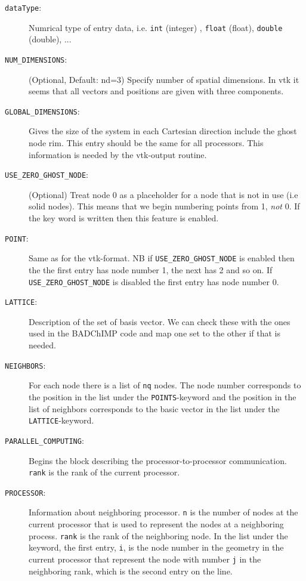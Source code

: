 \documentclass[11pt,a4paper]{report}
\begin{document}
\begin{description}
\item[\texttt{dataType}:] Numrical type of entry data, i.e. \texttt{int} (integer) , \texttt{float} (float), \texttt{double} (double), ... 
%	
\item[\texttt{NUM{\_}DIMENSIONS}:] (Optional, Default: nd=3)  Specify number of spatial dimensions. In vtk it seems that all vectors and positions are given with three components. 
%
\item[\texttt{GLOBAL{\_}DIMENSIONS}:] Gives the size of the system in each Cartesian direction include the ghost node rim. This entry should be the same for all processors. This information is needed by the vtk-output routine.
%
\item[\texttt{USE{\_}ZERO{\_}GHOST{\_}NODE}:] (Optional) Treat node 0 as a placeholder for a node that is not in use (i.e solid nodes). This means that we begin numbering points from 1, \emph{not} 0. If the key word is written then this feature is enabled.
%
\item[\texttt{POINT}:] Same as for the vtk-format. NB if \texttt{USE{\_}ZERO{\_}GHOST{\_}NODE} is enabled then the the first entry has node number 1, the next has 2 and so on. If \texttt{USE{\_}ZERO{\_}GHOST{\_}NODE} is disabled  the first entry has node number 0.
%
\item[\texttt{LATTICE}:] Description of the set of basis vector. We can check these with the ones used in the BADChIMP code and map one set to the other if that is needed.
%
\item[\texttt{NEIGHBORS}:]  For each node there is a list of \texttt{nq} nodes. The node number corresponds to the position in the list under the \texttt{POINTS}-keyword and the position in the list of neighbors corresponds to the basic vector in the list under the \texttt{LATTICE}-keyword.
%
\item[\texttt{PARALLEL{\_}COMPUTING}:] Begins the block describing the processor-to-processor communication. \texttt{rank} is the rank of the current processor.
%
\item[\texttt{PROCESSOR}:]  Information about neighboring processor. \texttt{n} is the number of nodes at the current processor that is used to represent the nodes at a neighboring process. \texttt{rank} is the rank of the neighboring node. In the list under the keyword, the first entry, \texttt{i}, is the node number in the geometry in the current processor that represent the node with number \texttt{j} in the neighboring rank, which is the second entry on the line.
\end{description}
\end{document}
